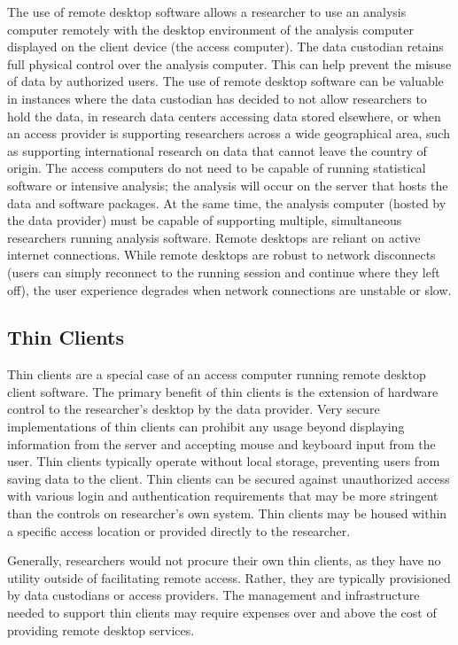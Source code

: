The use of remote desktop software allows a researcher to use an analysis computer remotely with the desktop environment of the analysis computer displayed on the client device (the access computer). The data custodian retains full physical control over the analysis computer. This can help prevent the misuse of data by authorized users. The use of remote desktop software can be valuable in instances where the data custodian has decided to not allow researchers to hold the data, in research data centers accessing data stored elsewhere, or when an access provider is supporting researchers across a wide geographical area, such as supporting international research on data that cannot leave the country of origin. The access computers do not need to be capable of running statistical software or intensive analysis; the analysis will occur on the server that hosts the data and software packages. At the same time, the analysis computer (hosted by the data provider) must be capable of supporting multiple, simultaneous researchers running analysis software. Remote desktops are reliant on active internet connections. While remote desktops are robust to network disconnects (users can simply reconnect to the running session and continue where they left off), the user experience degrades when network connections are unstable or slow.

\hypertarget{thin-clients}{%
\subsection{Thin Clients}\label{thin-clients}}

Thin clients are a special case of an access computer running remote desktop client software. The primary benefit of thin clients is the extension of hardware control to the researcher's desktop by the data provider. Very secure implementations of thin clients can prohibit any usage beyond displaying information from the server and accepting mouse and keyboard input from the user. Thin clients typically operate without local storage, preventing users from saving data to the client. Thin clients can be secured against unauthorized access with various login and authentication requirements that may be more stringent than the controls on researcher's own system. Thin clients may be housed within a specific access location or provided directly to the researcher.

Generally, researchers would not procure their own thin clients, as they have no utility outside of facilitating remote access. Rather, they are typically provisioned by data custodians or access providers. The management and infrastructure needed to support thin clients may require expenses over and above the cost of providing remote desktop services.

